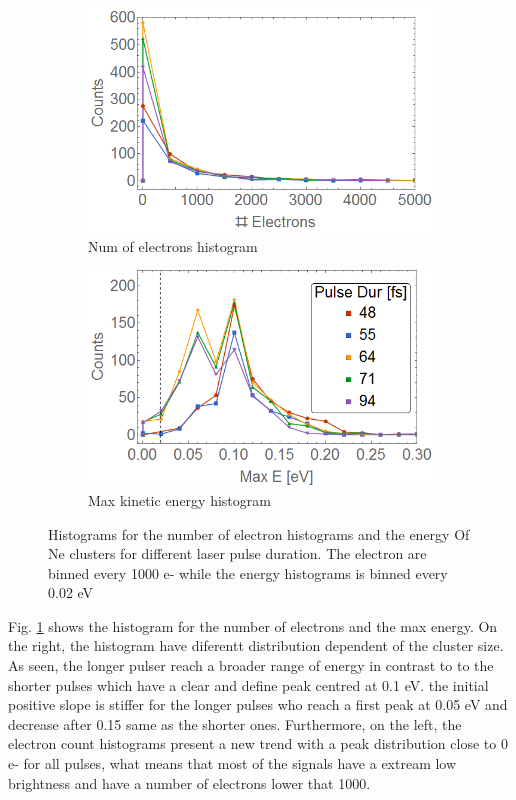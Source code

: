 \begin{figure}[h!]
\hfill
\begin{subfigure}[l]{0.48\textwidth}\caption{Num of electrons histogram}
\includegraphics[width=1\textwidth]{../Images/results/MIR_Ne_pulseduration/HElec.png} 
\end{subfigure} 
\begin{subfigure}[l]{0.48\textwidth}\caption{Max kinetic energy histogram}
\includegraphics[width=1\textwidth]{../Images/results/MIR_Ne_pulseduration/HEnerg.png} 
\end{subfigure} \hfill
\caption[MIR Ne pulse duration. Histograms]{Histograms for the number of electron histograms and the energy  Of Ne clusters for different laser pulse duration. The electron are binned every 1000 e- while the energy histograms is binned every 0.02 eV }
\label{fig:NeonpulseHisto}
\end{figure}

Fig. \ref{fig:NeonpulseHisto} shows the histogram for the number of electrons  and the max energy. On the right, the histogram have diferentt distribution dependent of the cluster size. As seen, the longer pulser reach a broader range of energy in contrast to to the shorter pulses which have a clear and define peak centred at 0.1 eV. the initial positive slope is stiffer for the longer pulses who reach a first peak at 0.05 eV and decrease after 0.15 same as the shorter ones. Furthermore, on the left, the electron count histograms present a new trend with a peak distribution close to 0 e- for all pulses, what means that most of the signals have a extream low brightness and have a number of electrons lower that 1000.

